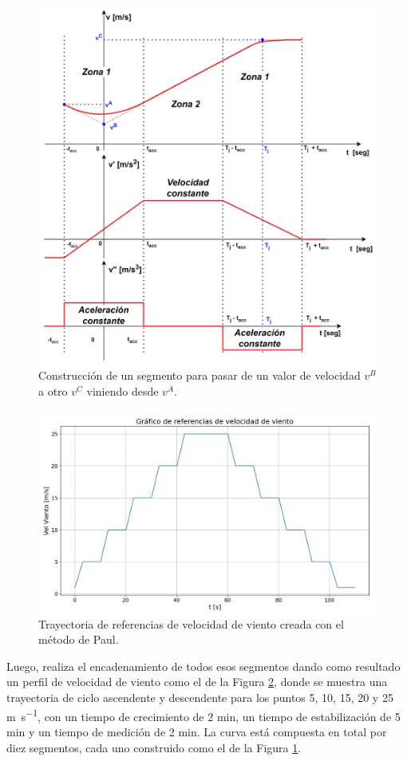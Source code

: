 \begin{figure}[H]
    \centering
    \includegraphics[width=0.78\linewidth]{Figuras/AplicacionWeb/backend/segmentoTrayect.png}
    \caption{Construcción de un segmento para pasar de un valor de velocidad $v^B$ a otro $v^C$ viniendo desde $v^A$.}
    \label{fig:segmentosZona1yZona2}
\end{figure}

\begin{figure}[H]
    \centering
    \includegraphics[width=0.8\linewidth]{Figuras/AplicacionWeb/backend/trayectoriaGenerada.jpg}
    \caption{Trayectoria de referencias de velocidad de viento creada con el método de Paul.}
    \label{fig:trayectoriaGenerada}
\end{figure}

Luego, realiza el encadenamiento de todos esos segmentos dando como resultado un perfil de velocidad de viento como el de la Figura \ref{fig:trayectoriaGenerada}, donde se muestra una trayectoria de ciclo ascendente y descendente para los puntos 5, 10, 15, 20 y 25 \unit{\meter\per\second}, con un tiempo de crecimiento de 2 \unit{\minute}, un tiempo de estabilización de 5 \unit{\minute} y un tiempo de medición de 2 \unit{\minute}. La curva está compuesta en total por diez segmentos, cada uno construido como el de la Figura \ref{fig:segmentosZona1yZona2}.
